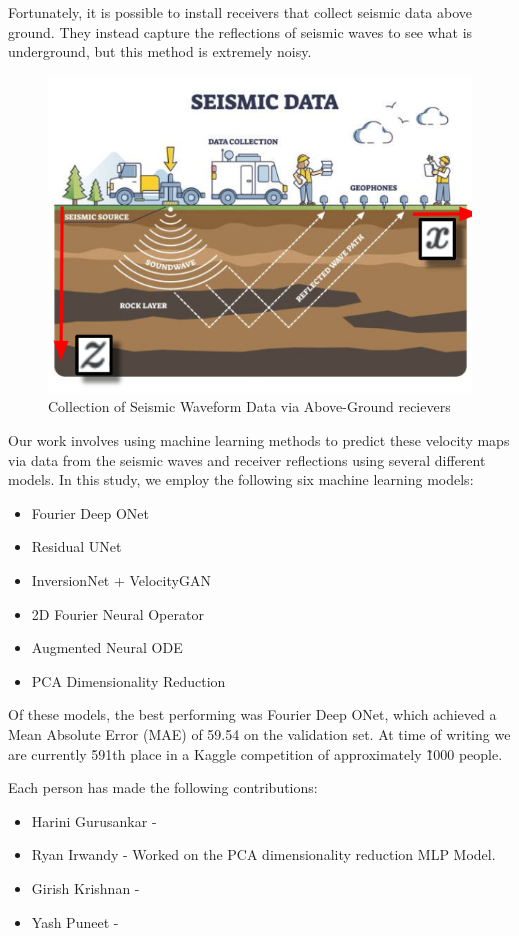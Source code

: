 \documentclass{article}
\begin{document}
    Fortunately, it is possible to install receivers that collect seismic data above ground. They instead capture the reflections of seismic waves to see what is underground, but this method is extremely noisy.   

    \begin{figure}[H]
        \centering
        \includegraphics[width=0.5\linewidth]{figures/intro1.png}
        \caption{Collection of Seismic Waveform Data via Above-Ground recievers }
        \label{fig:intro1}
    \end{figure}

    Our work involves using machine learning methods to predict these velocity maps via data from the seismic waves and receiver reflections using several different models. In this study, we employ the following six machine learning models: 

    \begin{itemize}
        \item Fourier Deep ONet
        \item Residual UNet 
        \item InversionNet + VelocityGAN 
        \item 2D Fourier Neural Operator
        \item Augmented Neural ODE 
        \item PCA Dimensionality Reduction
    \end{itemize}

    Of these models, the best performing was Fourier Deep ONet, which achieved a Mean Absolute Error (MAE) of 59.54 on the validation set. At time of writing we are currently 591th place in a Kaggle competition of approximately \~ 1000 people. 

    Each person has made the following contributions: 

    \begin{itemize}
        \item Harini Gurusankar - 
        \item Ryan Irwandy - Worked on the PCA dimensionality reduction MLP Model. 
        \item Girish Krishnan -
        \item Yash Puneet - 
    \end{itemize}
\end{document}
